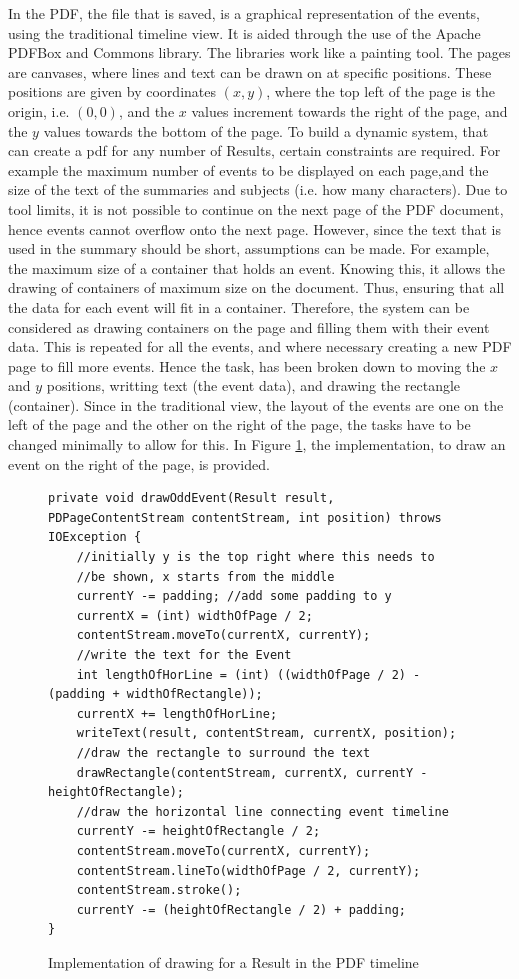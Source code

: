 \par In the PDF, the file that is saved, is a graphical representation of the events, using the traditional timeline view. It is aided through the use of the Apache PDFBox and Commons library. The libraries work like a painting tool. The pages are canvases, where lines and text can be drawn on at specific positions. These positions are given by coordinates $(x,y)$, where the top left of the page is the origin, i.e. $(0,0)$, and the $x$ values increment towards the right of the page, and the $y$ values towards the bottom of the page. To build a dynamic system, that can create a pdf for any number of Results, certain constraints are required. For example the maximum number of events to be displayed on each page,and the size of the text of the summaries and subjects (i.e. how many characters). Due to tool limits, it is not possible to continue on the next page of the PDF document, hence events cannot overflow onto the next page. However, since the text that is used in the summary should be short, assumptions can be made. For example, the maximum size of a container that holds an event. Knowing this, it allows the drawing of containers of maximum size on the document. Thus, ensuring that all the data for each event will fit in a container. Therefore, the system can be considered as drawing containers on the page and filling them with their event data. This is repeated for all the events, and where necessary creating a new PDF page to fill more events. Hence the task, has been broken down to moving the $x$ and $y$ positions, writting text (the event data), and drawing the rectangle (container). Since in the traditional view, the layout of the events are one on the left of the page and the other on the right of the page, the tasks have to be changed minimally to allow for this. In Figure \ref{fig:drawRecImplemented}, the implementation, to draw an event on the right of the page, is provided.

\begin{figure}[H]
\begin{lstlisting}
private void drawOddEvent(Result result, PDPageContentStream contentStream, int position) throws IOException {
	//initially y is the top right where this needs to 
	//be shown, x starts from the middle
	currentY -= padding; //add some padding to y
	currentX = (int) widthOfPage / 2;
	contentStream.moveTo(currentX, currentY);
	//write the text for the Event
	int lengthOfHorLine = (int) ((widthOfPage / 2) - (padding + widthOfRectangle));
	currentX += lengthOfHorLine;
	writeText(result, contentStream, currentX, position);
	//draw the rectangle to surround the text
	drawRectangle(contentStream, currentX, currentY - heightOfRectangle);
	//draw the horizontal line connecting event timeline
	currentY -= heightOfRectangle / 2;
	contentStream.moveTo(currentX, currentY);
	contentStream.lineTo(widthOfPage / 2, currentY);
	contentStream.stroke();
	currentY -= (heightOfRectangle / 2) + padding;
}
\end{lstlisting}
\caption{Implementation of drawing for a Result in the PDF timeline}
\label{fig:drawRecImplemented}
\end{figure}

